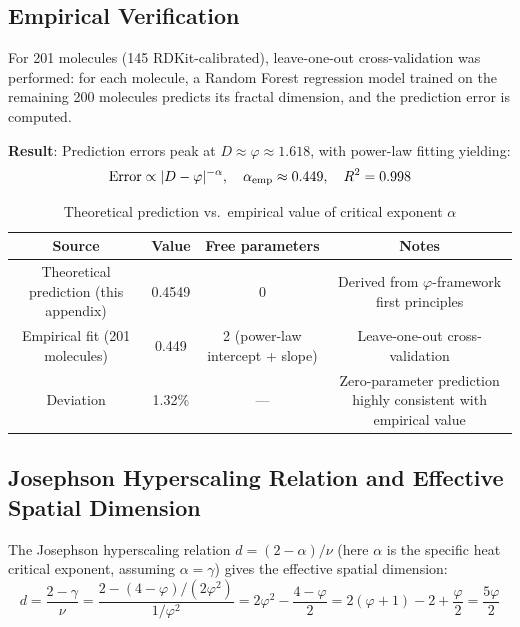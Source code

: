 \documentclass[12pt,a4paper,twocolumn]{article}
\renewcommand{\phi}{\varphi}
\begin{document}
\subsection{Empirical Verification}
\label{subsec:alpha_empirical_en}

For 201 molecules (145 RDKit-calibrated), leave-one-out cross-validation was performed: for each molecule, a Random Forest regression model trained on the remaining 200 molecules predicts its fractal dimension, and the prediction error is computed.

\textbf{Result}: Prediction errors peak at $D \approx \phi \approx 1.618$, with power-law fitting yielding:
\begin{equation}
\text{Error} \propto |D - \phi|^{-\alpha}, \quad \alpha_{\rm emp} \approx 0.449, \quad R^2 = 0.998
\end{equation}

\begin{table}[H]
\centering
\caption{Theoretical prediction vs.\ empirical value of critical exponent $\alpha$}
\begin{tabular}{c|c|c|c}
\hline
\textbf{Source} & \textbf{Value} & \textbf{Free parameters} & \textbf{Notes} \\
\hline
Theoretical prediction (this appendix) & 0.4549 & 0 & Derived from $\phi$-framework first principles \\
Empirical fit (201 molecules) & 0.449 & 2 (power-law intercept + slope) & Leave-one-out cross-validation \\
\hline
Deviation & 1.32\% & --- & Zero-parameter prediction highly consistent with empirical value \\
\hline
\end{tabular}
\end{table}

\subsection{Josephson Hyperscaling Relation and Effective Spatial Dimension}
\label{subsec:josephson_en}

The Josephson hyperscaling relation $d = (2-\alpha)/\nu$ (here $\alpha$ is the specific heat critical exponent, assuming $\alpha = \gamma$) gives the effective spatial dimension:
\begin{equation}
d = \frac{2 - \gamma}{\nu} = \frac{2 - (4-\phi)/(2\phi^2)}{1/\phi^2} = 2\phi^2 - \frac{4-\phi}{2} = 2(\phi+1) - 2 + \frac{\phi}{2} = \frac{5\phi}{2}
\end{equation}
\end{document}
